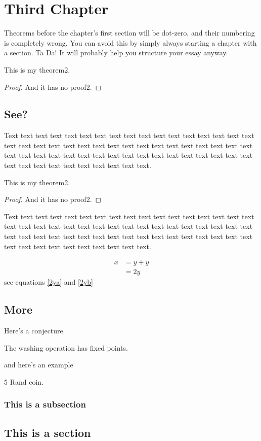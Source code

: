 \chapter{Third Chapter}

Theorems before the chapter's first section will be dot-zero, 
and their numbering is completely wrong. You can avoid this
by simply always starting a chapter with a section. Ta Da! 
It will probably help you structure your essay anyway. 

\begin{thm}[My Theorem2]
This is my theorem2.
\end{thm}
\begin{proof}
And it has no proof2.
\end{proof}

\section{See?}

Text text text text text text text text text text text text text text
text text text text text text text text text text text text text text
text text text text text text text text text text text text text text
text text text text text text text text text text text text text text
text text text text text.

\begin{thm}[My Theorem2]
This is my theorem2.
\end{thm}
\begin{proof}
And it has no proof2.
\end{proof}

Text text text text text text text text text text text text text text
text text text text text text text text text text text text text text
text text text text text text text text text text text text text text
text text text text text text text text text text text text text text
text text text text text.

\begin{align} %
\label{2ya}
x & = y + y\\
\label{2yb}
& = 2y
\end{align}
see equations \ref{2ya} and \ref{2yb}

\section{More}

Here's a conjecture
\begin{conj}
The washing operation has fixed points.
\end{conj}

and here's an example

\begin{exa}
5 Rand coin.
\end{exa}

\subsection{This is a subsection}

\section{This is a section}
